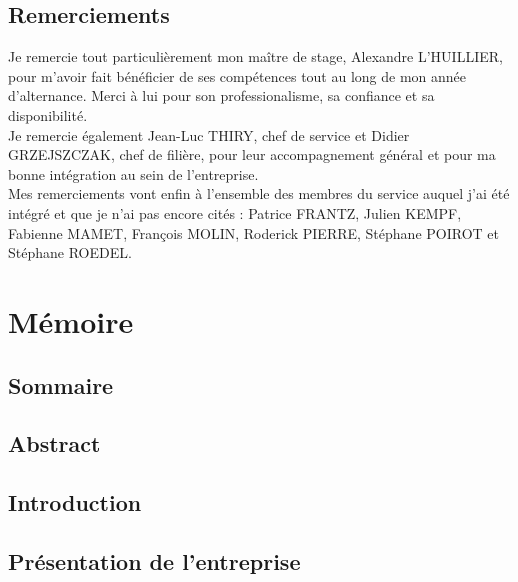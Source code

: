 \documentclass[a4paper, 12pt]{report}
\begin{document}

\chapter*{Remerciements}
\thispagestyle{empty}

Je remercie tout particulièrement mon maître de stage, Alexandre L'HUILLIER, pour m'avoir fait bénéficier de ses compétences tout au long de mon année d'alternance. Merci à lui pour son professionalisme, sa confiance et sa disponibilité.\\

Je remercie également Jean-Luc THIRY, chef de service et Didier GRZEJSZCZAK, chef de filière, pour leur accompagnement général et pour ma bonne intégration au sein de l'entreprise.\\

Mes remerciements vont enfin à l'ensemble des membres du service auquel j'ai été intégré et que je n'ai pas encore cités : Patrice FRANTZ, Julien KEMPF, Fabienne MAMET, François MOLIN, Roderick PIERRE, Stéphane POIROT et Stéphane ROEDEL.


\part{Mémoire}
\renewcommand{\clearpage}{}
\chapter*{Sommaire}
\renewcommand\ptctitle{}
\parttoc
\thispagestyle{empty}
\renewcommand{\clearpage}{\newpage}
\clearpage


\chapter*{Abstract}


\chapter*{Introduction}


\chapter{Présentation de l'entreprise}
\end{document}
